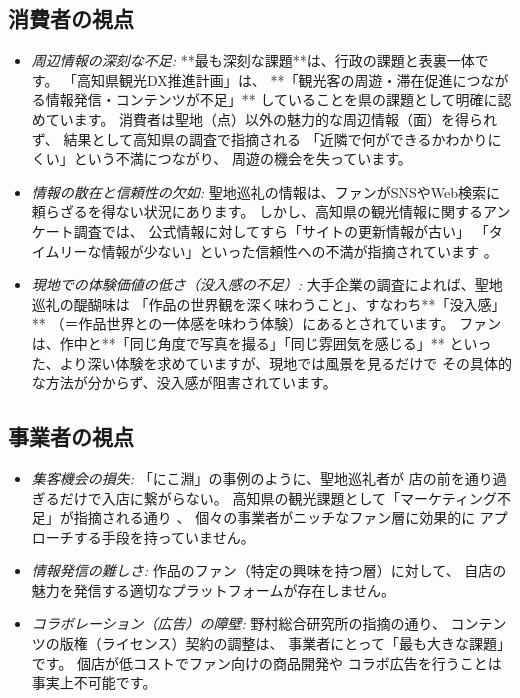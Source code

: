 \documentclass{docs}
\begin{document}
\subsection{消費者の視点}
\begin{itemize}
	\item \emph{周辺情報の深刻な不足:}
    **最も深刻な課題**は、行政の課題\cite{kochi_dx_plan}と表裏一体です。
    「高知県観光DX推進計画」\cite{kochi_dx_plan}は、
    **「観光客の周遊・滞在促進につながる情報発信・コンテンツが不足」**
    していることを県の課題として明確に認めています。
    消費者は聖地（点）以外の魅力的な周辺情報（面）を得られず、
    結果として高知県の調査\cite{kochi_tech_2017}で指摘される
    「近隣で何ができるかわかりにくい」という不満につながり、
    周遊の機会を失っています。

    \item \emph{情報の散在と信頼性の欠如:}
    聖地巡礼の情報は、ファンがSNSやWeb検索に頼らざるを得ない状況にあります。
    しかし、高知県の観光情報に関するアンケート調査では、
    公式情報に対してすら「サイトの更新情報が古い」
    「タイムリーな情報が少ない」といった信頼性への不満が指摘されています
    \cite{kochi_tech_2017}。

    \item \emph{現地での体験価値の低さ（没入感の不足）:}
    大手企業の調査\cite{toppan2025}によれば、聖地巡礼の醍醐味は
    「作品の世界観を深く味わうこと」、すなわち**「没入感」**
    （＝作品世界との一体感を味わう体験）にあるとされています。
    ファンは、作中と**「同じ角度で写真を撮る」「同じ雰囲気を感じる」**
    といった、より深い体験を求めていますが、現地では風景を見るだけで
    その具体的な方法が分からず、没入感が阻害されています。
\end{itemize}


\subsection{事業者の視点}
\begin{itemize}
\item \emph{集客機会の損失:}
    「にこ淵」の事例\cite{nikobuchi_mlit}のように、聖地巡礼者が
    店の前を通り過ぎるだけで入店に繋がらない。
    高知県の観光課題として「マーケティング不足」が指摘される通り
    \cite{kochi_tech_2017}、
    個々の事業者がニッチなファン層に効果的に
    アプローチする手段を持っていません。

    \item \emph{情報発信の難しさ:}
    作品のファン（特定の興味を持つ層）に対して、
    自店の魅力を発信する適切なプラットフォームが存在しません。

    \item \emph{コラボレーション（広告）の障壁:}
    野村総合研究所の指摘\cite{nri2024}の通り、
    コンテンツの版権（ライセンス）契約の調整は、
    事業者にとって「最も大きな課題」です。
    個店が低コストでファン向けの商品開発や
    コラボ広告を行うことは事実上不可能です。
\end{itemize}
\end{document}

